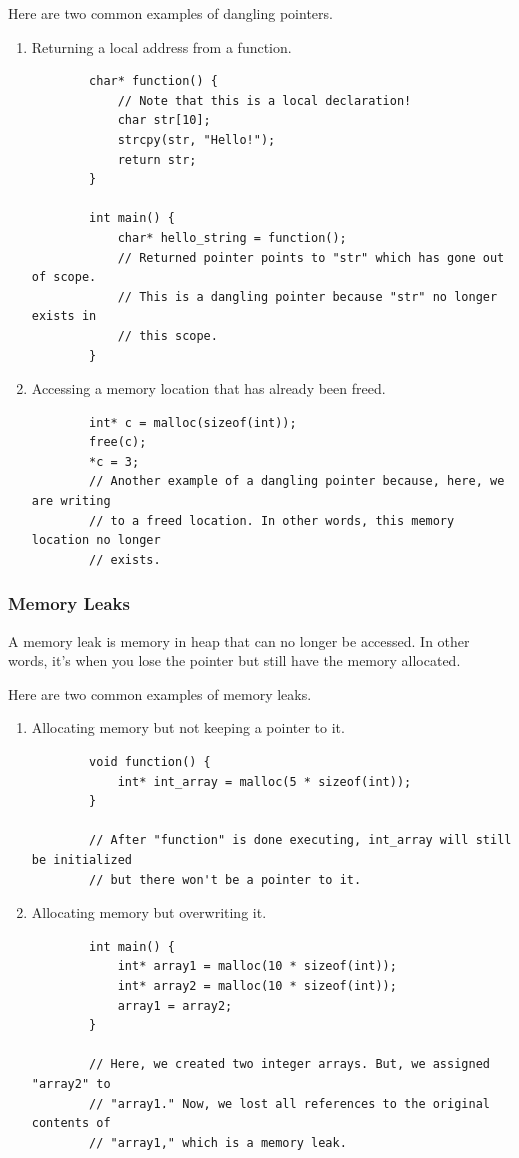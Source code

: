 \documentclass[letterpaper]{article}
\begin{document}
\bigskip 

Here are two common examples of dangling pointers. 
\begin{enumerate}
    \item Returning a local address from a function.
    \begin{verbatim}
        char* function() {
            // Note that this is a local declaration! 
            char str[10];
            strcpy(str, "Hello!");
            return str;
        }

        int main() {
            char* hello_string = function(); 
            // Returned pointer points to "str" which has gone out of scope.
            // This is a dangling pointer because "str" no longer exists in 
            // this scope. 
        }
    \end{verbatim}
    
    \item Accessing a memory location that has already been freed. 
    \begin{verbatim}
        int* c = malloc(sizeof(int)); 
        free(c);
        *c = 3;
        // Another example of a dangling pointer because, here, we are writing 
        // to a freed location. In other words, this memory location no longer 
        // exists. 
    \end{verbatim}
\end{enumerate}

\subsubsection{Memory Leaks}
A memory leak is memory in heap that can no longer be accessed. In other words, it's when you lose the pointer but still have the memory allocated. 

\bigskip 

Here are two common examples of memory leaks. 
\begin{enumerate}
    \item Allocating memory but not keeping a pointer to it. 
    \begin{verbatim}
        void function() {
            int* int_array = malloc(5 * sizeof(int));
        }

        // After "function" is done executing, int_array will still be initialized
        // but there won't be a pointer to it. 
    \end{verbatim}

    \item Allocating memory but overwriting it. 
    \begin{verbatim}
        int main() {
            int* array1 = malloc(10 * sizeof(int)); 
            int* array2 = malloc(10 * sizeof(int)); 
            array1 = array2; 
        }
        
        // Here, we created two integer arrays. But, we assigned "array2" to 
        // "array1." Now, we lost all references to the original contents of 
        // "array1," which is a memory leak. 
    \end{verbatim}
\end{enumerate}
\end{document}
